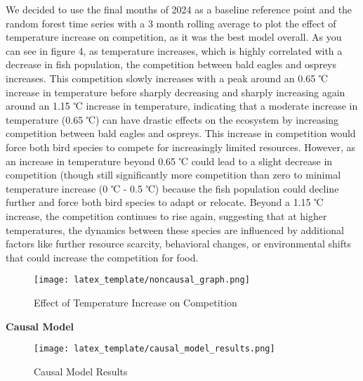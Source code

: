 \documentclass{article}
\begin{document}
We decided to use the final months of 2024 as a baseline reference point and the random forest time series with a 3 month rolling average to plot the effect of temperature increase on competition, as it was the best model overall. As you can see in figure 4, as temperature increases, which is highly correlated with a decrease in fish population, the competition between bald eagles and ospreys increases. This competition slowly increases with a peak around an 0.65 ℃ increase in temperature before sharply decreasing and sharply increasing again around an 1.15 ℃ increase in temperature, indicating that a moderate increase in temperature (0.65 ℃) can have drastic effects on the ecosystem by increasing competition between bald eagles and ospreys. This increase in competition would force both bird species to compete for increasingly limited resources. However, as an increase in temperature beyond 0.65 ℃ could lead to a slight decrease in competition (though still significantly more competition than zero to minimal temperature increase (0 ℃ - 0.5 ℃) because the fish population could decline further and force both bird species to adapt or relocate. Beyond a 1.15 ℃ increase, the competition continues to rise again, suggesting that at higher temperatures, the dynamics between these species are influenced by additional factors like further resource scarcity, behavioral changes, or environmental shifts that could increase the competition for food. 

\begin{figure}[htbp]
\centerline{\texttt{[image: latex\_template/noncausal\_graph.png]}}
\caption{Effect of Temperature Increase on Competition}
\label{fig}
\end{figure}

\textbf{Causal Model}

\begin{figure}[htbp]
\centerline{\texttt{[image: latex\_template/causal\_model\_results.png]}}
\caption{Causal Model Results}
\label{fig}
\end{figure}
\end{document}
